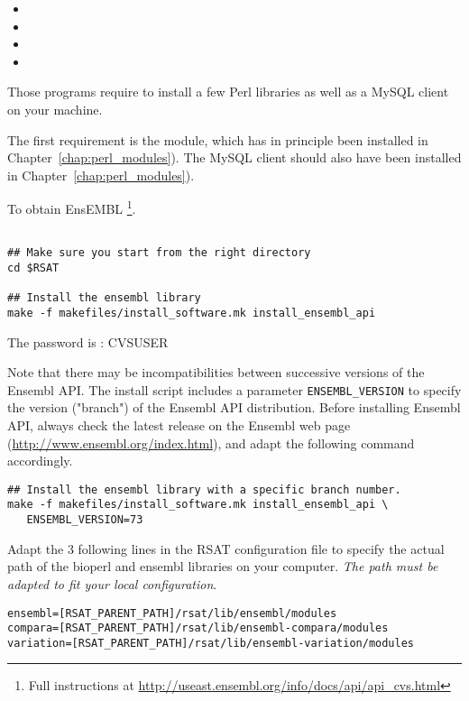 \documentclass[12pt,a4paper, oneside]{scrreprt} %
\begin{document}
\begin{itemize}
\item {}
\item {}
\item {} 
\item {}
\end{itemize}

Those programs require to install a few Perl libraries as well as a
MySQL client on your machine. 

The first requirement is the  module, which has in
principle been installed in Chapter~\ref{chap:perl_modules}). The MySQL client should also have been installed in Chapter~\ref{chap:perl_modules}).


To obtain EnsEMBL \footnote{Full instructions at
  \url{http://useast.ensembl.org/info/docs/api/api_cvs.html}}.

\begin{lstlisting}

## Make sure you start from the right directory
cd $RSAT

## Install the ensembl library
make -f makefiles/install_software.mk install_ensembl_api 
\end{lstlisting}

The password is : CVSUSER


Note that there may be incompatibilities between successive versions
of the Ensembl API. The install script includes a parameter
\texttt{ENSEMBL\_VERSION} to specify the version ("branch") of the
Ensembl API distribution. Before installing Ensembl API, always check
the latest release on the Ensembl web page
(\url{http://www.ensembl.org/index.html}), and adapt the following
command accordingly.

\begin{lstlisting}
## Install the ensembl library with a specific branch number.
make -f makefiles/install_software.mk install_ensembl_api \
   ENSEMBL_VERSION=73
\end{lstlisting}

Adapt the 3 following lines in the RSAT configuration file
 to specify the actual path of the bioperl
and ensembl libraries on your computer. \emph{The path must be adapted
  to fit your local configuration}.

\begin{lstlisting}
ensembl=[RSAT_PARENT_PATH]/rsat/lib/ensembl/modules
compara=[RSAT_PARENT_PATH]/rsat/lib/ensembl-compara/modules
variation=[RSAT_PARENT_PATH]/rsat/lib/ensembl-variation/modules
\end{lstlisting}
\end{document}
